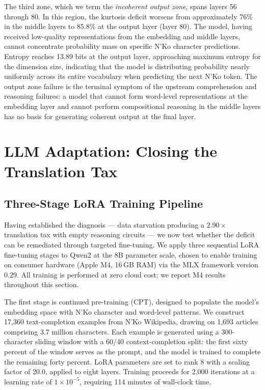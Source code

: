 \documentclass[11pt]{article}
\newcommand{\nko}{N'Ko}
\begin{document}
The third zone, which we term the \emph{incoherent output zone}, spans layers 56 through 80. In this region, the kurtosis deficit worsens from approximately 76\% in the middle layers to 85.8\% at the output layer (layer 80). The model, having received low-quality representations from the embedding and middle layers, cannot concentrate probability mass on specific \nko{} character predictions. Entropy reaches 13.89 bits at the output layer, approaching maximum entropy for the dimension size, indicating that the model is distributing probability nearly uniformly across its entire vocabulary when predicting the next \nko{} token. The output zone failure is the terminal symptom of the upstream comprehension and reasoning failures: a model that cannot form word-level representations at the embedding layer and cannot perform compositional reasoning in the middle layers has no basis for generating coherent output at the final layer.

\section{LLM Adaptation: Closing the Translation Tax}
\label{sec:llm_adaptation}

\subsection{Three-Stage LoRA Training Pipeline}
\label{sec:lora_pipeline}

Having established the diagnosis --- data starvation producing a $2.90\times$ translation tax with empty reasoning circuits --- we now test whether the deficit can be remediated through targeted fine-tuning. We apply three sequential LoRA fine-tuning stages to Qwen2 at the 8B parameter scale, chosen to enable training on consumer hardware (Apple M4, 16\,GB RAM) via the MLX framework version 0.29. All training is performed at zero cloud cost; we report M4 results throughout this section.

The first stage is continued pre-training (CPT), designed to populate the model's embedding space with \nko{} character and word-level patterns. We construct 17,360 text-completion examples from \nko{} Wikipedia, drawing on 1,693 articles comprising 3.7 million characters. Each example is generated using a 300-character sliding window with a 60/40 context-completion split: the first sixty percent of the window serves as the prompt, and the model is trained to complete the remaining forty percent. LoRA parameters are set to rank 8 with a scaling factor of 20.0, applied to eight layers. Training proceeds for 2,000 iterations at a learning rate of $1 \times 10^{-5}$, requiring 114 minutes of wall-clock time.
\end{document}
